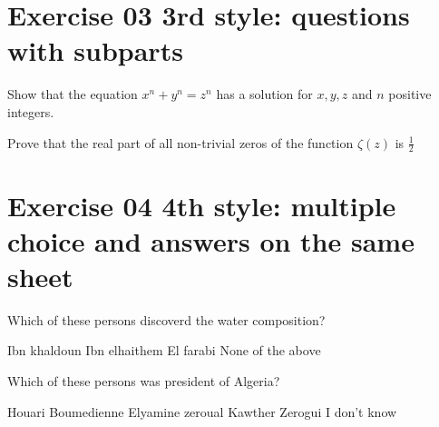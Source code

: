 \documentclass[11pt]{exam}
\begin{document}
\section*{Exercise 03 \small 3rd style: questions with subparts}%
\begin{questions}
\question Show that the  equation \(x^n + y^n = z^n\) has a solution for \(x,y,z\) and \(n\) positive integers. 

\question Prove that the real part of all non-trivial zeros of the function 
\(\zeta(z)\) is \(\frac{1}{2}\)
\end{questions}
\section*{Exercise 04 \small 4th style: multiple choice and answers on the same sheet}
\begin{questions}
\question Which of these persons discoverd the water composition?

\begin{oneparchoices}
 \choice Ibn khaldoun 
 \choice Ibn elhaithem
 \choice El farabi
 \choice None of the above
\end{oneparchoices}
    
\question Which of these persons was president of Algeria?

\begin{checkboxes}
 \choice Houari Boumedienne 
 \choice Elyamine zeroual
 \choice Kawther Zerogui
 \choice I don't know
\end{checkboxes}
\end{questions}
\end{document}
